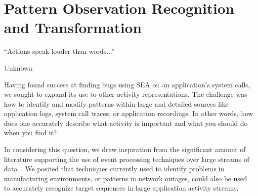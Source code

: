 \chapter{Pattern Observation Recognition and Transformation}
\label{chap:port}


\epigraph{ ``Actions speak louder than words...'' }{Unknown}


Having found success at finding bugs using SEA on an application's system calls,
we sought to expand its use to other activity representations.
The challenge was
how to identify and modify patterns within
large and detailed sources like application logs,
system call traces,
or application recordings.
In other words, how does one
accurately describe what activity is important
and what you should do when you find it?

%
In considering this question, we drew inspiration from
the significant amount of literature supporting the use of event
processing techniques over large streams of data~\cite{DBLP:conf/sigmod/AgrawalDGI08,DBLP:conf/debs/Hirzel12,DBLP:journals/ibmrd/HirzelAGJKKMNSSW13,DBLP:journals/csur/DayarathnaP18}. We posited that techniques
currently used to identify problems in  manufacturing environments, or patterns in
network outages, could also be used to accurately recognize target
sequences in large
application activity streams.

